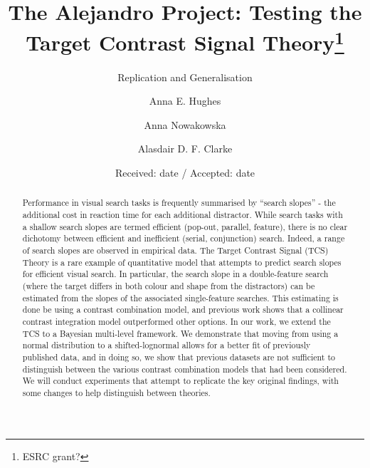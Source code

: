 \documentclass[smallextended, natbib]{svjour3}       %
\begin{document}
\title{The Alejandro Project: Testing the Target Contrast Signal Theory\thanks{ESRC grant?}
}
\subtitle{Replication and Generalisation}


\author{Anna E. Hughes \and Anna Nowakowska \and Alasdair D. F. Clarke}



\date{Received: date / Accepted: date}

\maketitle

\begin{abstract}
Performance in visual search tasks is frequently summarised by ``search slopes'' - the additional cost in reaction time for each additional distractor. While search tasks with a  shallow search slopes are termed efficient (pop-out, parallel, feature), there is no clear dichotomy between efficient and inefficient (serial, conjunction) search. Indeed, a range of search slopes are observed in empirical data. The Target Contrast Signal (TCS) Theory is a rare example of quantitative model that attempts to predict search slopes for efficient visual search. In particular, the search slope in a double-feature search (where the target differs in both colour and shape from the distractors) can be estimated from the slopes of the associated single-feature searches. This estimating is done be using a contrast combination model, and previous work shows that a collinear contrast integration model outperformed other options. In our work, we extend the TCS to a Bayesian multi-level framework. We demonstrate that moving from using a normal distribution to a shifted-lognormal allows for a better fit of previously published data, and in doing so, we show that previous datasets are not sufficient to distinguish between the various contrast combination models that had been considered. We will conduct experiments that attempt to replicate the key original findings, with some changes to help distinguish between theories. 

\end{abstract}
\end{document}

